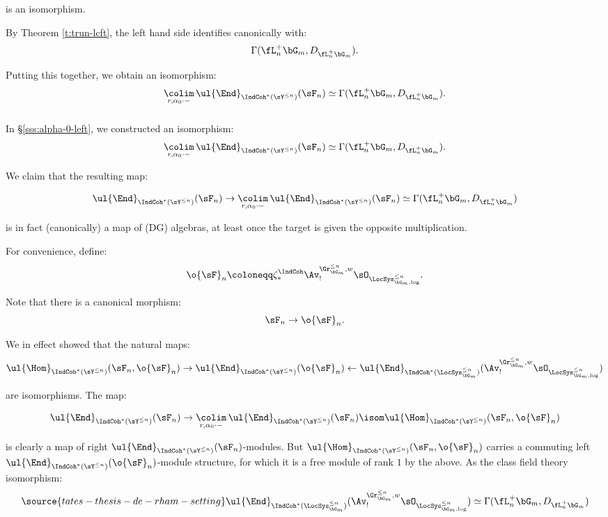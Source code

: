  is an isomorphism.

By Theorem \ref{t:trun-lcft}, the left hand side identifies canonically with:
%
\[
\Gamma(\fL_n^+ \bG_m,D_{\fL_n^+ \bG_m}).
\]

Putting this together, we obtain an isomorphism:
%
\[
\underset{r,\alpha_0\cdot-}{\colim} \, \ul{\End}_{\IndCoh^*(\sY^{\leq n})}(\sF_n)
\simeq
\Gamma(\fL_n^+ \bG_m,D_{\fL_n^+ \bG_m}).
\]

\subsubsection{}\label{sss:alpha-alg}

In \S \ref{sss:alpha-0-left}, we constructed an isomorphism:
%
\[
\underset{r,\alpha_0\cdot-}{\colim} \, \ul{\End}_{\IndCoh^*(\sY^{\leq n})}(\sF_n)
\simeq
\Gamma(\fL_n^+ \bG_m,D_{\fL_n^+ \bG_m}).
\]

 We claim that the resulting map:

\[
\ul{\End}_{\IndCoh^*(\sY^{\leq n})}(\sF_n) \to
\underset{r,\alpha_0\cdot-}{\colim} \, \ul{\End}_{\IndCoh^*(\sY^{\leq n})}(\sF_n)
\simeq \Gamma(\fL_n^+ \bG_m,D_{\fL_n^+ \bG_m})
\]

 is in fact (canonically) a map of (DG) algebras, at least
once the target is given the opposite multiplication.

For convenience, define:
%
\[
\o{\sF}_n \coloneqq
\zeta_*^{\IndCoh}\Av_!^{\Gr_{\bG_m}^{\leq n},w}\sO_{\LocSys_{\bG_m,\log}^{\leq n}}.
\]

 Note that there is a canonical morphism:
%
\[
\sF_n \to \o{\sF}_n.
\]

 We in effect showed that the natural maps:
%
\[
\ul{\Hom}_{\IndCoh^*(\sY^{\leq n})}(\sF_n,\o{\sF}_n) \to
\ul{\End}_{\IndCoh^*(\sY^{\leq n})}(\o{\sF}_n)  \leftarrow
\ul{\End}_{\IndCoh^*(\LocSys_{\bG_m}^{\leq n})}
(\Av_!^{\Gr_{\bG_m}^{\leq n},w}\sO_{\LocSys_{\bG_m,\log}^{\leq n}})
\]

 are isomorphisms. The map:

\[
\ul{\End}_{\IndCoh^*(\sY^{\leq n})}(\sF_n) \to
\underset{r,\alpha_0\cdot-}{\colim} \, \ul{\End}_{\IndCoh^*(\sY^{\leq n})}(\sF_n)
\isom
\ul{\Hom}_{\IndCoh^*(\sY^{\leq n})}(\sF_n,\o{\sF}_n)
\]

 is clearly a map of right
$\ul{\End}_{\IndCoh^*(\sY^{\leq n})}(\sF_n)$-modules.
But $\ul{\Hom}_{\IndCoh^*(\sY^{\leq n})}(\sF_n,\o{\sF}_n)$ carries
a commuting left
$\ul{\End}_{\IndCoh^*(\sY^{\leq n})}(\o{\sF}_n)$-module structure,
for which it is a free module of rank $1$ by the above.
As the class field theory isomorphism:
%
\begin{equation}\label{eq:lcft-diff}
\source{tates-thesis-de-rham-setting}
\ul{\End}_{\IndCoh^*(\LocSys_{\bG_m}^{\leq n})}
(\Av_!^{\Gr_{\bG_m}^{\leq n},w}\sO_{\LocSys_{\bG_m,\log}^{\leq n}})
\simeq \Gamma(\fL_n^+ \bG_m,D_{\fL_n^+ \bG_m})
\end{equation}

